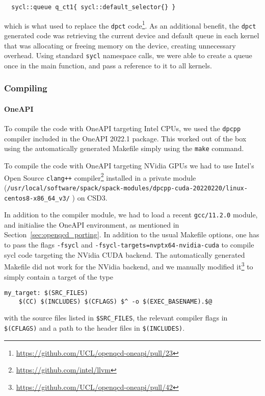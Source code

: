 \documentclass[../main]{subfiles}
\begin{document}
\begin{verbatim}
  sycl::queue q_ct1{ sycl::default_selector{} }
\end{verbatim}

which is what used to replace the \texttt{dpct} code\footnote{\url{https://github.com/UCL/openqcd-oneapi/pull/23}}. As an additional benefit, the \texttt{dpct} generated code was retrieving the current device and default queue in each kernel that was allocating or freeing memory on the device, creating unnecessary overhead. Using standard \texttt{sycl} namespace calls, we were able to create a queue once in the main function, and pass a reference to it to all kernels.

\subsubsection{Compiling}\label{sec:openqcd_compiling}

\paragraph{OneAPI}

To compile the code with OneAPI targeting Intel CPUs, we used the \texttt{dpcpp} compiler included in the OneAPI 2022.1 package.
This worked out of the box using the automatically generated Makefile simply using the \texttt{make} command.

To compile the code with OneAPI targeting NVidia GPUs we had to use Intel's Open Source \verb #clang++# compiler\footnote{\url{https://github.com/intel/llvm}} installed in a private module (\verb #/usr/local/software/spack/spack-modules/dpcpp-cuda-20220220/linux-centos8-x86_64_v3/# ) on CSD3.

In addition to the compiler module, we had to load a recent \verb #gcc/11.2.0# module, and initialise the OneAPI environment, as mentioned in Section~\ref{sec:openqcd_porting}.
In addition to the usual Makefile options, one has to pass the flags \verb #-fsycl# and \verb #-fsycl-targets=nvptx64-nvidia-cuda# to compile sycl code targeting the NVidia CUDA backend.
The automatically generated Makefile did not work for the NVidia backend, and we manually modified it\footnote{\url{https://github.com/UCL/openqcd-oneapi/pull/42}} to simply contain a target of the type
\begin{verbatim}
my_target: $(SRC_FILES)
	$(CC) $(INCLUDES) $(CFLAGS) $^ -o $(EXEC_BASENAME).$@
\end{verbatim}
with the source files listed in \verb #$SRC_FILES#, the relevant compiler flags in \verb #$(CFLAGS)# and a path to the header files in \verb #$(INCLUDES)#.
\end{document}
